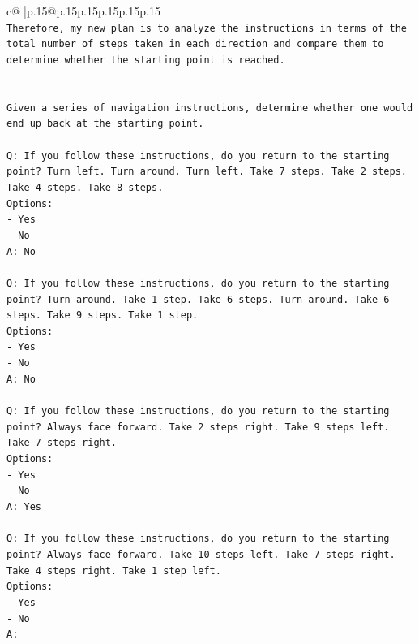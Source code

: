 \documentclass{article}
\begin{document}
{\begin{supertabular}{c@{$\;$}|p{.15\linewidth}@{}p{.15\linewidth}p{.15\linewidth}p{.15\linewidth}p{.15\linewidth}p{.15\linewidth}}
{{{\\ 
\texttt{Therefore, my new plan is to analyze the instructions in terms of the total number of steps taken in each direction and compare them to determine whether the starting point is reached.} \\
\\ 
\\ 
\texttt{Given a series of navigation instructions, determine whether one would end up back at the starting point.} \\
\\ 
\texttt{Q: If you follow these instructions, do you return to the starting point? Turn left. Turn around. Turn left. Take 7 steps. Take 2 steps. Take 4 steps. Take 8 steps.} \\
\texttt{Options:} \\
\texttt{{-} Yes} \\
\texttt{{-} No} \\
\texttt{A: No} \\
\\ 
\texttt{Q: If you follow these instructions, do you return to the starting point? Turn around. Take 1 step. Take 6 steps. Turn around. Take 6 steps. Take 9 steps. Take 1 step.} \\
\texttt{Options:} \\
\texttt{{-} Yes} \\
\texttt{{-} No} \\
\texttt{A: No} \\
\\ 
\texttt{Q: If you follow these instructions, do you return to the starting point? Always face forward. Take 2 steps right. Take 9 steps left. Take 7 steps right.} \\
\texttt{Options:} \\
\texttt{{-} Yes} \\
\texttt{{-} No} \\
\texttt{A: Yes} \\
\\ 
\texttt{Q: If you follow these instructions, do you return to the starting point? Always face forward. Take 10 steps left. Take 7 steps right. Take 4 steps right. Take 1 step left.} \\
\texttt{Options:} \\
\texttt{{-} Yes} \\
\texttt{{-} No} \\
\texttt{A:} \\
            }
        }
    }
     \\ \\


\end{supertabular}}
\end{document}
